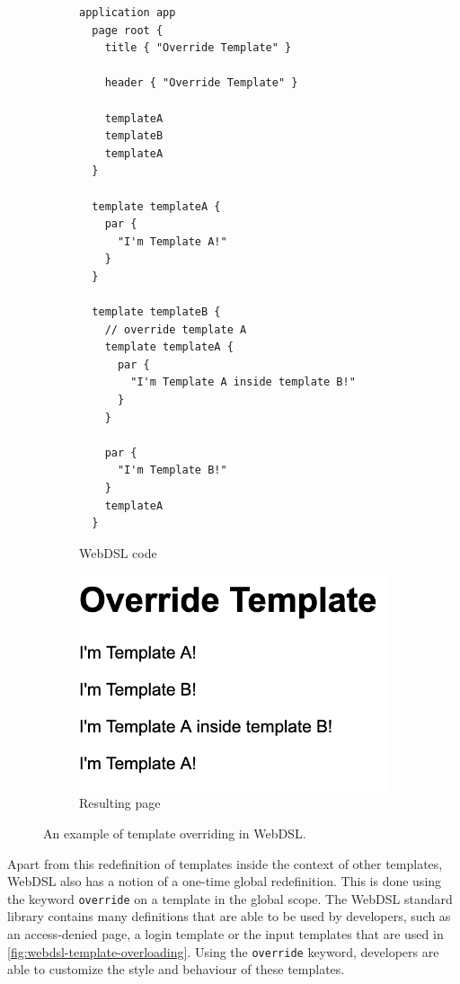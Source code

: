       \begin{figure}
        \begin{subfigure}[t]{0.45\textwidth}
          \begin{verbatim}
application app
  page root {
    title { "Override Template" }

    header { "Override Template" }

    templateA
    templateB
    templateA
  }

  template templateA {
    par {
      "I'm Template A!"
    }
  }

  template templateB {
    // override template A
    template templateA {
      par {
        "I'm Template A inside template B!"
      }
    }

    par {
      "I'm Template B!"
    }
    templateA
  }
          \end{verbatim}
          \caption{\label{fig:webdsl-template-overriding-webdsl}WebDSL code}
        \end{subfigure}
        \begin{subfigure}[t]{0.55\textwidth}
          \capstart
          \includegraphics[width=\textwidth]{../img/webdsl-template-overriding}
          \caption{\label{fig:webdsl-template-overriding-page}Resulting page}
        \end{subfigure}
      \caption{\label{fig:webdsl-template-overriding}An example of template overriding in WebDSL.}
      \end{figure}

      Apart from this redefinition of templates inside the context of other templates, WebDSL also has a notion of a one-time global redefinition. This is done using the keyword \texttt{override} on a template in the global scope. The WebDSL standard library contains many definitions that are able to be used by developers, such as an access-denied page, a login template or the input templates that are used in \cref{fig:webdsl-template-overloading}. Using the \texttt{override} keyword, developers are able to customize the style and behaviour of these templates.

